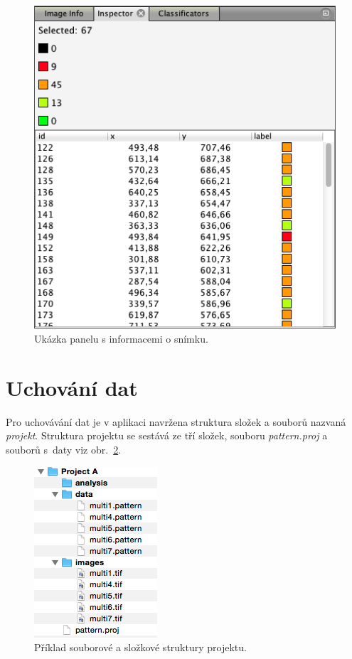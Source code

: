 \documentclass[11pt,twoside,a4paper,table]{book}
\begin{document}
\begin{figure}[hp]
	\centering
	\includegraphics[scale=0.5]{figures/app_inspector.png}
	\caption{Ukázka panelu s informacemi o snímku.}
	\label{fig:app_inspector}
\end{figure}

\section{Uchování dat}
\label{sec:uchovani_dat}
Pro uchovávání dat je v aplikaci navržena struktura složek a souborů nazvaná \textit{projekt}. Struktura projektu se sestává ze tří složek, souboru \textit{pattern.proj} a souborů s~daty viz obr.~\ref{fig:project_structure}.

\begin{figure}[hp]
	\centering
	\includegraphics[scale=1]{figures/app_project_structure.png}
	\caption{Příklad souborové a složkové struktury projektu.}
	\label{fig:project_structure}
\end{figure}
\end{document}
